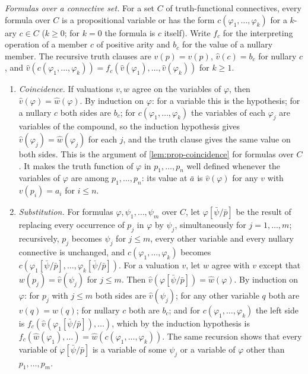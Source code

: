 \emph{Formulas over a connective set.}  For a set \(C\) of truth-functional
connectives, every formula over \(C\) is a propositional variable or has the
form \(c(\varphi_1,\ldots,\varphi_k)\) for a \(k\)-ary \(c\in C\)
(\(k\geq0\); for \(k=0\) the formula is \(c\) itself).  Write \(f_c\) for the
interpreting operation of a member \(c\) of positive arity and \(b_c\) for the
value of a nullary member.  The recursive truth clauses are
\(\widehat v(p)=v(p)\), \(\widehat v(c)=b_c\) for nullary \(c\), and
\(\widehat v(c(\varphi_1,\ldots,\varphi_k))=
f_c(\widehat v(\varphi_1),\ldots,\widehat v(\varphi_k))\) for \(k\geq1\).
\begin{enumerate}
\item[(F1)] \emph{Coincidence.}  If valuations \(v,w\) agree on the variables
  of \(\varphi\), then \(\widehat v(\varphi)=\widehat w(\varphi)\).  By
  induction on \(\varphi\): for a variable this is the hypothesis; for a
  nullary \(c\) both sides are \(b_c\); for
  \(c(\varphi_1,\ldots,\varphi_k)\) the variables of each \(\varphi_j\) are
  variables of the compound, so the induction hypothesis gives
  \(\widehat v(\varphi_j)=\widehat w(\varphi_j)\) for each \(j\), and the
  truth clause gives the same value on both sides.  This is the argument of
  \cref{lem:prop-coincidence} for formulas over \(C\).  It makes the truth
  function of \(\varphi\) in \(p_1,\ldots,p_n\) well defined whenever the
  variables of \(\varphi\) are among \(p_1,\ldots,p_n\): its value at
  \(\bar a\) is \(\widehat v(\varphi)\) for any \(v\) with \(v(p_i)=a_i\)
  for \(i\leq n\).
\item[(F2)] \emph{Substitution.}  For formulas \(\varphi,\psi_1,\ldots,\psi_m\)
  over \(C\), let \(\varphi[\bar\psi/\bar p]\) be the result of replacing
  every occurrence of \(p_j\) in \(\varphi\) by \(\psi_j\), simultaneously
  for \(j=1,\ldots,m\); recursively, \(p_j\) becomes \(\psi_j\) for
  \(j\leq m\), every other variable and every nullary connective is
  unchanged, and \(c(\varphi_1,\ldots,\varphi_k)\) becomes
  \(c(\varphi_1[\bar\psi/\bar p],\ldots,\varphi_k[\bar\psi/\bar p])\).  For a
  valuation \(v\), let \(w\) agree with \(v\) except that
  \(w(p_j)=\widehat v(\psi_j)\) for \(j\leq m\).  Then
  \(\widehat v(\varphi[\bar\psi/\bar p])=\widehat w(\varphi)\).  By
  induction on \(\varphi\): for \(p_j\) with \(j\leq m\) both sides are
  \(\widehat v(\psi_j)\); for any other variable \(q\) both are
  \(v(q)=w(q)\); for nullary \(c\) both are \(b_c\); and for
  \(c(\varphi_1,\ldots,\varphi_k)\) the left side is
  \(f_c(\widehat v(\varphi_1[\bar\psi/\bar p]),\ldots)\), which by the
  induction hypothesis is \(f_c(\widehat w(\varphi_1),\ldots)=
  \widehat w(c(\varphi_1,\ldots,\varphi_k))\).  The same recursion shows that
  every variable of \(\varphi[\bar\psi/\bar p]\) is a variable of some
  \(\psi_j\) or a variable of \(\varphi\) other than \(p_1,\ldots,p_m\).
\end{enumerate}

